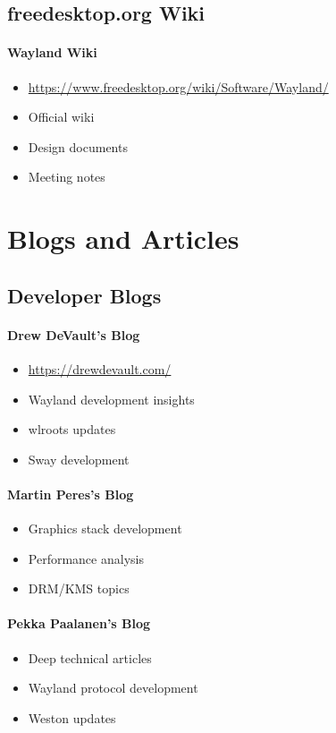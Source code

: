 \subsection{freedesktop.org Wiki}

\paragraph{Wayland Wiki}
\begin{itemize}
    \item \url{https://www.freedesktop.org/wiki/Software/Wayland/}
    \item Official wiki
    \item Design documents
    \item Meeting notes
\end{itemize}

\section{Blogs and Articles}

\subsection{Developer Blogs}

\paragraph{Drew DeVault's Blog}
\begin{itemize}
    \item \url{https://drewdevault.com/}
    \item Wayland development insights
    \item wlroots updates
    \item Sway development
\end{itemize}

\paragraph{Martin Peres's Blog}
\begin{itemize}
    \item Graphics stack development
    \item Performance analysis
    \item DRM/KMS topics
\end{itemize}

\paragraph{Pekka Paalanen's Blog}
\begin{itemize}
    \item Deep technical articles
    \item Wayland protocol development
    \item Weston updates
\end{itemize}

